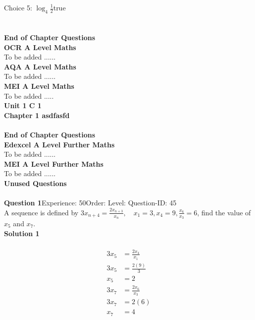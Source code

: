 \documentclass{article}
\begin{document}
Choice 5: \hspace{20pt}$\log_{4}\displaystyle\frac{1}{2}$\hspace{20pt}true\\
\\[4pt]
\\[2pt]
\noindent\large{\textbf{End of Chapter Questions}}\\[15pt]
\noindent\Huge{\textbf{OCR A Level Maths}}\\[5pt]
\noindent\large{To be added ......}\\[20pt]
\noindent\Huge{\textbf{AQA A Level Maths}}\\[5pt]
\noindent\large{To be added ......}\\[20pt]
\noindent\Huge{\textbf{MEI A Level Maths}}\\[5pt]
\noindent\large{To be added .....}\\[20pt]
\noindent\huge{\textbf{Unit 1 C 1}}\\[18pt]
\noindent\huge{\textbf{Chapter 1 asdfasfd}}\\[15pt]
\\[2pt]
\noindent\large{\textbf{End of Chapter Questions}}\\[15pt]
\noindent\Huge{\textbf{Edexcel A Level Further Maths}}\\[5pt]
\noindent\large{To be added ......}\\[20pt]
\noindent\Huge{\textbf{MEI A Level Further Maths}}\\[5pt]
\noindent\large{To be added ......}\\[20pt]
\noindent\Huge{\textbf{Unused Questions}}\\[10pt]
\noindent\large{}\\\noindent\textbf{Question 1}\hspace{20pt}Experience: 50\hspace{20pt}Order: \hspace{20pt}Level: \hspace{20pt}Question-ID: 45\\[2pt]
A sequence is defined by $3x_{n+4}=\displaystyle\frac{2x_{n+3}}{x_n}, \quad x_1=3,x_4=9, \displaystyle\frac{x_6}{x_3}=6$, find the value of $x_5$ and $x_7$.\\[4pt]
\noindent\textbf{Solution 1}\\[2pt]
\\[-35pt]\begin{align*}
3x_5&=\displaystyle\frac{2x_{4}}{x_1}\\[2pt]
3x_5&=\displaystyle\frac{2(9)}{3}\\[2pt]
x_5&=2\\[12pt]
3x_7&=\displaystyle\frac{2x_6}{x_3}\\[2pt]
3x_7&=2(6)\\[2pt]
x_7&=4
\end{align*}
\end{document}
